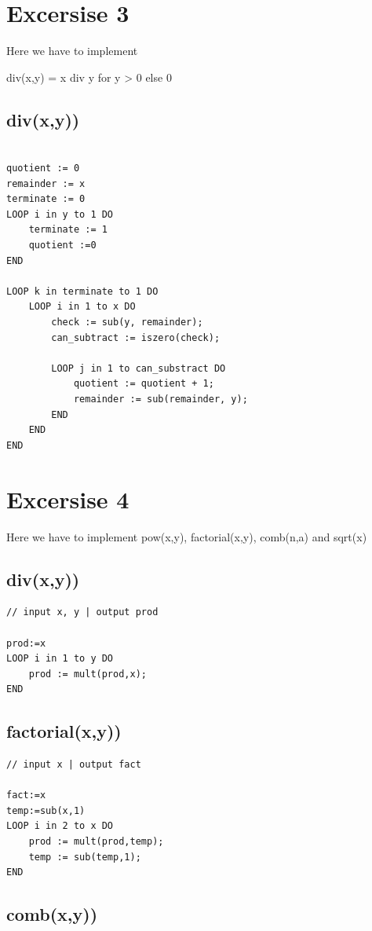 \documentclass[11pt,a4paper]{article}
\begin{document}
\pagebreak

\section*{Excersise 3}
Here we have to implement


div(x,y) = x div y for y > 0 else 0
\subsection*{div(x,y))}
\begin{lstlisting}

quotient := 0
remainder := x
terminate := 0
LOOP i in y to 1 DO
    terminate := 1
    quotient :=0
END

LOOP k in terminate to 1 DO
    LOOP i in 1 to x DO
        check := sub(y, remainder);
        can_subtract := iszero(check);

        LOOP j in 1 to can_substract DO
            quotient := quotient + 1;
            remainder := sub(remainder, y);
        END
    END
END

\end{lstlisting}

\pagebreak

\section*{Excersise 4}
Here we have to implement pow(x,y), factorial(x,y), comb(n,a) and sqrt(x)
\subsection*{div(x,y))}
\begin{lstlisting}
// input x, y | output prod

prod:=x
LOOP i in 1 to y DO
    prod := mult(prod,x);
END

\end{lstlisting}

\subsection*{factorial(x,y))}
\begin{lstlisting}
// input x | output fact

fact:=x
temp:=sub(x,1)
LOOP i in 2 to x DO
    prod := mult(prod,temp);
    temp := sub(temp,1);
END

\end{lstlisting}

\subsection*{comb(x,y))}
\end{document}
